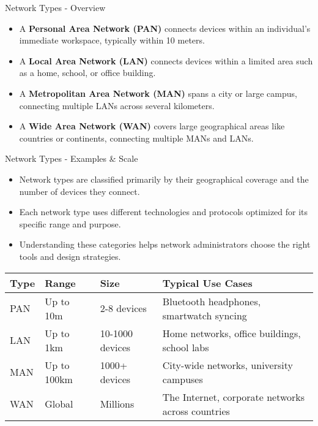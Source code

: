 \documentclass[aspectratio=169]{beamer}
\begin{document}
\begin{frame}{Network Types - Overview}

\begin{itemize}
    \item A \textbf{Personal Area Network (PAN)} connects devices within an individual's immediate workspace, typically within 10 meters.
    \item A \textbf{Local Area Network (LAN)} connects devices within a limited area such as a home, school, or office building.
    \item A \textbf{Metropolitan Area Network (MAN)} spans a city or large campus, connecting multiple LANs across several kilometers.
    \item A \textbf{Wide Area Network (WAN)} covers large geographical areas like countries or continents, connecting multiple MANs and LANs.
\end{itemize}

\end{frame}

\begin{frame}{Network Types - Examples \& Scale}

\begin{itemize}
    \item Network types are classified primarily by their geographical coverage and the number of devices they connect.
    \item Each network type uses different technologies and protocols optimized for its specific range and purpose.
    \item Understanding these categories helps network administrators choose the right tools and design strategies.
\end{itemize}

\vspace{0.3cm}

\begin{table}
\centering
\small
\begin{tabular}{|l|l|l|p{4cm}|}
\hline
\rowcolor{networkblue!30}
\textbf{Type} & \textbf{Range} & \textbf{Size} & \textbf{Typical Use Cases} \\ \hline
PAN & Up to 10m & 2-8 devices & Bluetooth headphones, smartwatch syncing \\ \hline
\rowcolor{gray!10}
LAN & Up to 1km & 10-1000 devices & Home networks, office buildings, school labs \\ \hline
MAN & Up to 100km & 1000+ devices & City-wide networks, university campuses \\ \hline
\rowcolor{gray!10}
WAN & Global & Millions & The Internet, corporate networks across countries \\ \hline
\end{tabular}
\end{table}

\end{frame}
\end{document}

